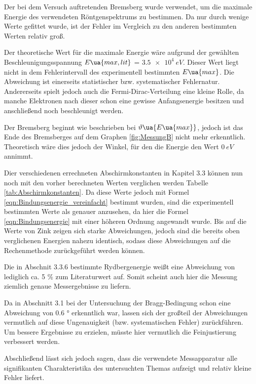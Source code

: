 Der bei dem Versuch auftretenden Bremsberg wurde verwendet, um die maximale
Energie des verwendeten Röntgenspektrums zu bestimmen. Da nur durch wenige
Werte gefittet wurde, ist der Fehler im Vergleich zu den anderen bestimmten
Werten relativ groß.

Der theoretische Wert für die maximale Energie wäre aufgrund der gewählten
Beschleunigungsspannung $E\ua{max,lit}$ = $\SI{3.5e4}{eV}$. Dieser Wert liegt nicht
in dem Fehlerintervall des experimentell bestimmten $E\ua{max}$. Die Abweichung
ist einerseits statistischer bzw. systematischer Fehlernatur. Andererseits spielt
jedoch auch die Fermi-Dirac-Verteilung eine kleine Rolle, da manche Elektronen
nach dieser schon eine gewisse Anfangsenergie besitzen und anschließend noch
beschleunigt werden.

Der Bremsberg beginnt wie beschrieben bei $\vartheta\ua{E\ua{max}}$, jedoch ist
das Ende des Bremsberges auf dem Graphen \ref{fig:MessungB} nicht mehr erkenntlich.
Theoretisch wäre dies jedoch der Winkel, für den die Energie den Wert $\SI{0}{eV}$
annimmt.

Dier verschiedenen errechneten Abschirmkonstanten in Kapitel 3.3 können nun noch
mit den vorher berechneten Werten verglichen werden Tabelle \ref{tab:Abschirmkonstanten}.
Da diese Werte jedoch mit
Formel \eqref{eqn:Bindungsenergie_vereinfacht} bestimmt wurden, sind die experimentell
bestimmten Werte als genauer anzusehen, da hier die Formel \eqref{eqn:Bindungsenergie}
mit einer höheren Ordnung angewandt wurde. Bis auf die Werte von Zink zeigen sich
starke Abweichungen, jedoch sind die bereits oben verglichenen Energien nahezu identisch,
sodass diese Abweichungen auf die Rechenmethode zurückgeführt werden können.



Die in Abschnit 3.3.6 bestimmte Rydbergenergie weißt eine Abweichung von lediglich
ca. 5 $\%$ zum Literaturwert auf. Somit scheint auch hier die Messung ziemlich
genaue Messergebnisse zu liefern.

Da in Abschnitt 3.1 bei der Untersuchung der Bragg-Bedingung schon eine Abweichung
von 0.6 ° erkenntlich war, lassen sich der großteil der Abweichungen vermutlich
auf diese Ungenauigkeit (bzw. systematischen Fehler) zurückführen. Um bessere
Ergebnisse zu erzielen, müsste
hier vermutlich die Feinjustierung verbessert werden.

Abschließend lässt sich jedoch sagen, dass die verwendete Messapparatur alle
signifikanten Charakteristika des untersuchten Themas aufzeigt und relativ
kleine Fehler liefert.
